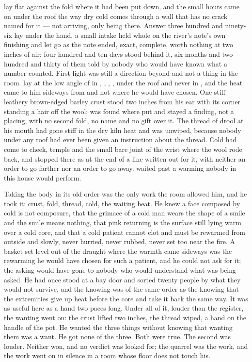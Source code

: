 
 lay flat against the fold where it had been put down, and the small hours came on under the roof the way dry cold comes through a wall that has no crack named for it --- not arriving, only being there. Answer three hundred and ninety-six lay under the hand, a small intake held whole on the river's note's own finishing and let go as the note ended, exact, complete, worth nothing at two inches of air; four hundred and ten days stood behind it, six months and two hundred and thirty of them told by nobody who would have known what a number counted. First light was still a direction beyond  and not a thing in the room.  lay at the low angle of  in , , , , under the roof and never in , and the heat came to him sideways from  and not where he would have chosen. One stiff leathery brown-edged barley crust stood two inches from his ear with its corner standing a hair off the wool;  was found where put and stayed a finding, not a placing, with no second fold, no name and no gift over it. The thread of drool at his mouth had gone stiff in the dry kiln heat and was unwiped, because nobody under any roof had ever been given an instruction about the thread. Cold had come to cheek, temple and the small bare joint of the wrist where the wool rode back, and stopped there as at the end of a line written out for it, with neither an order to go farther nor an order to go away.  waited past a warming nobody in this house would perform.

Taking the body in its old order was the only work the room allowed him, and he took it: crust, fold, thread, cold, the waiting heat. He knew a face composed by cold is not composure, that the grimace of a cold man wears the shape of a smile and the smile means nothing, that pink returning is the surface still lying warm over a cold core, and that a cold patient cannot clot and must be rewarmed from outside and slowly, never hurried, never rubbed, never set too near the fire. A basket set level out of the draught where the warmth came sideways was the rewarming he would have chosen for such a patient, and he could not ask for it; the asking would have gone to nobody who would understand what was being asked. He had once stood at a bay door and sorted twenty people by what they would not survive, and the knowing was of the same order as the knowing that the extremities give up heat before the core and take it back the same way. It was as useful here as a hand two paces long. Under all of it, louder than the register, the wanting went on: the crust lifted two inches, the thread wiped, a hand on the handle of the pot. He wanted the three things without knowing that wanting them was a want. He got none of the three. Both were true. The second was louder. Neither won, and no verdict was looked for; the quarrel was the work, and the work went on in silence in a room whose floor does not touch his.


